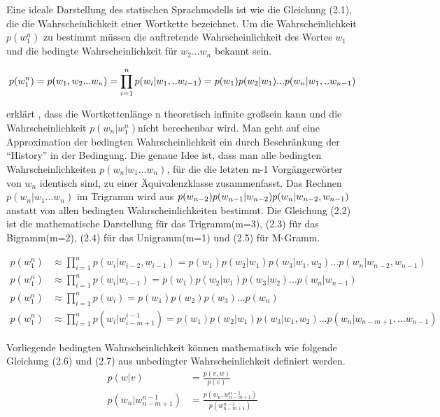 Eine ideale Darstellung des statischen Sprachmodells ist wie die Gleichung (2.1), die die Wahrscheinlichkeit einer Wortkette bezeichnet. Um die Wahrscheinlichkeit $p(w_{1}^n)$ zu bestimmt m\"ussen die auftretende Wahrscheinlichkeit des Wortes $w_{1}$ und die bedingte Wahrscheinlichkeit f\"ur $w_{2}...w_{n}$ bekannt sein.

\begin{equation}
p(w_{1}^n) = p(w_{1},w_{2}...w_{n}) = \prod_{i=1}^n p(w_{i}|w_{1},..w_{i-1}) \\
= p(w_{1})p(w_{2}|w_{1})...p(w_{n}|w_{1},..w_{n-1})
\end{equation}

\cite{book_speech} erkl\"art , dass die Wortkettenl\"ange n theoretisch infinite gro\ss sein kann und die Wahrscheinlichkeit $p(w_{n}|w_{1}^n)$nicht berechenbar wird. Man geht auf eine Approximation der bedingten Wahrscheinlichkeit ein durch Beschr\"ankung der "`History"' in der Bedingung. Die genaue Idee ist, dass man alle bedingten Wahrscheinlichkeiten $p(w_{n}|w_{1}...w_{n})$, f\"ur die die letzten m-1 Vorg\"angerw\"orter von $w_{n}$ identisch sind, zu einer \"Aquivalenzklasse zusammenfasst. Das Rechnen $p(w_{n}|w_{1}...w_{n})$ im Trigramm wird aus $p(w_{n-2})p(w_{n-1}|w_{n-2})p(w_{n}|\\w_{n-2},w_{n-1})$ anstatt von allen bedingten Wahrscheinlichkeiten bestimmt. 
Die Gleichung (2.2) ist die mathematische Darstellung f\"ur das Trigramm(m=3), (2.3) f\"ur das Bigramm(m=2), (2.4) f\"ur das Unigramm(m=1) und (2.5) f\"ur M-Gramm.

\begin{align}
p(w_{1}^n) & \approx \prod_{i=1}^n p(w_{i}|w_{i-2},w_{i-1})=p(w_{1})p(w_{2}|w_{1})p(w_{3}|w_{1},w_{2})...p(w_{n}|w_{n-2},w_{n-1}) \\
p(w_{1}^n) & \approx \prod_{i=1}^n p(w_{i}|w_{i-1})=p(w_{1})p(w_{2}|w_{1})p(w_{3}|w_{2})...p(w_{n}|w_{n-1}) \\
p(w_{1}^n) & \approx \prod_{i=1}^n p(w_{i})=p(w_{1})p(w_{2})p(w_{3})...p(w_{n})\\
p(w_{1}^n) & \approx \prod_{i=1}^n p(w_{i}|w_{i-m+1}^{i-1})=p(w_{1})p(w_{2}|w_{1})p(w_{3}|w_{1},w_{2})...p(w_{n}|w_{n-m+1},...w_{n-1})
\end{align}

Vorliegende bedingten Wahrscheinlichkeit k\"onnen mathematisch wie folgende Gleichung (2.6) und (2.7)  aus unbedingter Wahrscheinlichkeit definiert werden.
\begin{align}
p(w|v) &=\frac{p(v,w)}{p(v)} \\
p(w_{n}|w_{n-m+1}^{n-1}) &=\frac{p(w_{n},w_{n-m+1}^{n-1} )}{p(w_{n-m+1}^{n-1})} 
\end{align}

